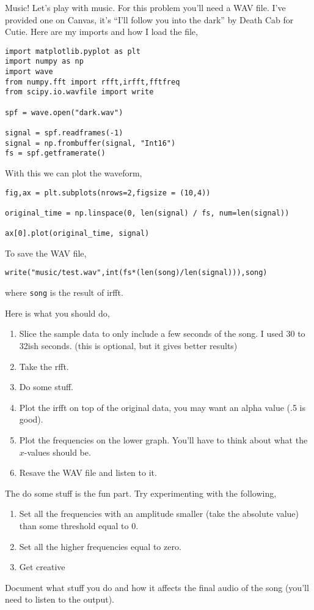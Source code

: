 \documentclass[11pt,letterpaper]{article}
\begin{document}
\begin{problem}
 Music! Let's play with music. For this problem you'll need a WAV file. I've provided one on 
Canvas, it's ``I'll follow you into the dark'' by Death Cab for Cutie. Here are my imports and 
how I load the file,
\begin{verbatim}
import matplotlib.pyplot as plt
import numpy as np
import wave
from numpy.fft import rfft,irfft,fftfreq
from scipy.io.wavfile import write

spf = wave.open("dark.wav")

signal = spf.readframes(-1)
signal = np.frombuffer(signal, "Int16")
fs = spf.getframerate()
\end{verbatim}
With this we can plot the waveform,
\begin{verbatim}
fig,ax = plt.subplots(nrows=2,figsize = (10,4))

original_time = np.linspace(0, len(signal) / fs, num=len(signal))

ax[0].plot(original_time, signal)
\end{verbatim}

To save the WAV file,
\begin{verbatim}
write("music/test.wav",int(fs*(len(song)/len(signal))),song)
\end{verbatim}
where \texttt{song} is the result of irfft. 

Here is what you should do,
\begin{enumerate}
 \item Slice the sample data to only include a few seconds of the song. I used 30 to 32ish seconds. 
(this is optional, but it gives better results)
 \item Take the rfft. 
 \item Do some stuff.
 \item Plot the irfft on top of the original data, you may want an alpha value (.5 is good).
 \item Plot the frequencies on the lower graph. You'll have to think about what the $x$-values
should be. 
 \item Resave the WAV file and listen to it. 
\end{enumerate}


The do some stuff is the fun part. Try experimenting with the following,
\begin{enumerate}
 \item Set all the frequencies with an amplitude smaller (take the absolute value) than some threshold
equal to 0.
 \item Set all the higher frequencies equal to zero. 
 \item Get creative
\end{enumerate}

Document what stuff you do and how it affects the final audio of the song (you'll need to listen
to the output).

\end{problem}
\end{document}
